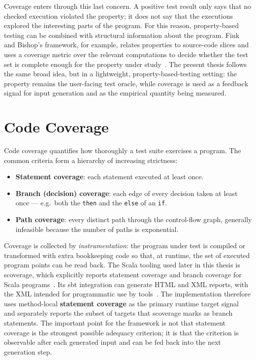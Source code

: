 \documentclass[11pt,a4paper]{report}
\begin{document}
Coverage enters through this last concern. A positive test result only says that no checked execution
violated the property; it does not say that the executions explored the interesting parts of the program.
For this reason, property-based testing can be combined with structural information about the program.
Fink and Bishop's framework, for example, relates properties to source-code slices and uses a coverage
metric over the relevant computations to decide whether the test set is complete enough for the property
under study~\cite{fink1997}. The present thesis follows the same broad idea, but in a lightweight,
property-based-testing setting: the property remains the user-facing test oracle, while coverage is used as
a feedback signal for input generation and as the empirical quantity being measured.

\section{Code Coverage}
\label{sec:coverage}

Code coverage quantifies how thoroughly a test suite exercises a program. The common criteria form a
hierarchy of increasing strictness:
\begin{itemize}[leftmargin=1.4em]
  \item \textbf{Statement coverage}: each statement executed at least once.
  \item \textbf{Branch (decision) coverage}: each edge of every decision taken at least once — e.g.\ both the \texttt{then} and the \texttt{else} of an \texttt{if}.
  \item \textbf{Path coverage}: every distinct path through the control-flow graph, generally infeasible because the number of paths is exponential.
\end{itemize}

Coverage is collected by \emph{instrumentation}: the program under test is compiled or transformed with
extra bookkeeping code so that, at runtime, the set of executed program points can be read back. The Scala
tooling used later in this thesis is scoverage, which explicitly reports statement coverage and branch
coverage for Scala programs~\cite{scoverage}. Its sbt integration can generate HTML and XML reports, with the
XML intended for programmatic use by tools~\cite{sbtscoverage}. The implementation therefore uses
method-local \textbf{statement coverage} as the primary runtime target signal and separately reports the
subset of targets that scoverage marks as branch statements. The important point for the framework is not
that statement coverage is the strongest possible adequacy criterion; it is that the criterion is observable
after each generated input and can be fed back into the next generation step.
\end{document}
